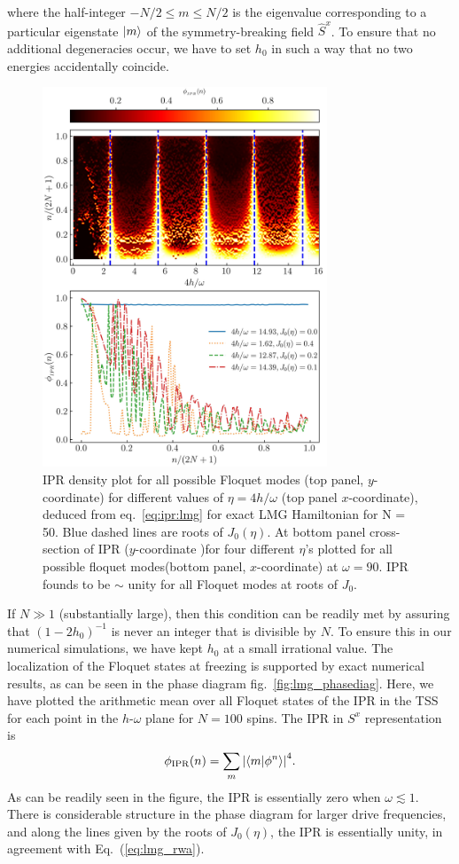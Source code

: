 \documentclass[%
reprint,
superscriptaddress,
amsmath,amssymb,
aps,
prb,
showkeys,
]{revtex4-2}
\begin{document}
where the half-integer $-N/2\leq m \leq N/2$ is the eigenvalue corresponding to a particular eigenstate $\ket{m}$ of the symmetry-breaking field $\hat{S}^x$. To ensure that no additional degeneracies occur, we have to set $h_0$ in  such a way that no two energies accidentally coincide.
\begin{figure}[t!]
	\centering
	\includegraphics[width = 8.5cm]{figure_5.jpeg}
	\caption{IPR density plot for all possible Floquet modes (top panel, $y$-coordinate) for different values of $\eta = 4h/\omega$ (top panel $x$-coordinate), deduced from eq.~\ref{eq:ipr:lmg} for exact LMG Hamiltonian for N = 50. Blue dashed lines are roots of $J_0(\eta)$. At bottom panel cross-section of IPR ($y$-coordinate )for four different $\eta$'s plotted for all possible floquet modes(bottom panel, $x$-coordinate) at $\omega=90$. IPR founds to be $\sim$ unity for all Floquet modes at roots of $J_0$.}
	\label{fig:lmg_ipr_exact}
\end{figure}
If $N\gg 1$ (substantially large), then this condition can be readily met by assuring that $(1-2h_0)^{-1}$ is never an integer that is divisible by $N$. To ensure this in our numerical simulations, we have kept $h_0$ at a small irrational value.
The localization of the Floquet states at freezing is supported by exact numerical results, as can be seen in the phase diagram fig.~\ref{fig:lmg_phasediag}. Here, we have plotted the arithmetic mean over all Floquet states of the IPR 
in the TSS for each point in the $h$-$\omega$ plane for $N=100$ spins.  The IPR in $S^x$ representation is
\begin{equation}
	\phi_\mathrm{IPR}(n) = \sum_m \abs{\ip{m}{\phi^n}}^4.
	\label{eq:ipr:lmg}
\end{equation}
As can be readily seen in the figure, the IPR is essentially zero when  $\omega \lesssim 1$. There is considerable structure in the phase diagram for larger drive frequencies, and along the lines given by the roots of $J_0(\eta)$, the IPR is essentially unity, in agreement with Eq.~(\ref{eq:lmg_rwa}).
\end{document}
